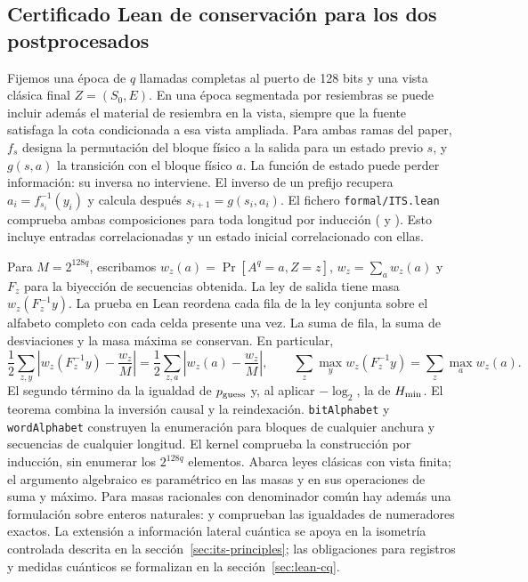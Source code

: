 \subsection{Certificado Lean de conservación para los dos postprocesados}
\label{sec:lean-its}
Fijemos una época de \(q\) llamadas completas al puerto de 128 bits y una vista
clásica final \(Z=(S_0,E)\). En una época segmentada por resiembras
se puede incluir además el material de resiembra en la vista, siempre que la fuente
satisfaga la cota condicionada a esa vista ampliada. Para ambas ramas del paper,
\(f_s\) designa la permutación del bloque físico a la salida para un estado
previo \(s\), y \(g(s,a)\) la transición con el bloque físico \(a\).
La función de estado puede perder información: su inversa no interviene.
El inverso de un prefijo recupera \(a_i=f_{s_i}^{-1}(y_i)\) y calcula después
\(s_{i+1}=g(s_i,a_i)\). El fichero \texttt{formal/ITS.lean} comprueba ambas
composiciones para toda longitud por inducción
( y ).
Esto incluye entradas correlacionadas y un estado inicial correlacionado con ellas.

Para \(M=2^{128q}\), escribamos \(w_z(a)=\Pr[A^q=a,Z=z]\),
\(w_z=\sum_a w_z(a)\) y \(F_z\) para la biyección de secuencias obtenida.
La ley de salida tiene masa \(w_z(F_z^{-1}y)\). La prueba en Lean reordena
cada fila de la ley conjunta sobre el alfabeto completo con cada celda presente
una vez. La suma de fila, la suma de desviaciones y la masa máxima se conservan.
En particular,
\[
 \frac12\sum_{z,y}\left|w_z(F_z^{-1}y)-\frac{w_z}{M}\right|
 =\frac12\sum_{z,a}\left|w_z(a)-\frac{w_z}{M}\right|,
 \qquad
 \sum_z\max_y w_z(F_z^{-1}y)=\sum_z\max_a w_z(a).
\]
El segundo término da la igualdad de \(p_{\mathrm{guess}}\) y, al aplicar
\(-\log_2\), la de \(H_{\min}\). El teorema 
combina la inversión causal y la reindexación. \texttt{bitAlphabet} y
\texttt{wordAlphabet} construyen la enumeración para bloques de cualquier anchura
y secuencias de cualquier longitud. El kernel comprueba la construcción por
inducción, sin enumerar los \(2^{128q}\) elementos. Abarca leyes clásicas con
vista finita; el argumento algebraico es paramétrico en las masas y en sus
operaciones de suma y máximo. Para masas racionales con denominador común
hay además una formulación sobre enteros naturales: 
y  comprueban las igualdades de numeradores
exactos. La extensión a información lateral cuántica se apoya en la isometría
controlada descrita en la sección~\ref{sec:its-principles}; las obligaciones para registros y medidas cuánticos se formalizan en la sección~\ref{sec:lean-cq}.

